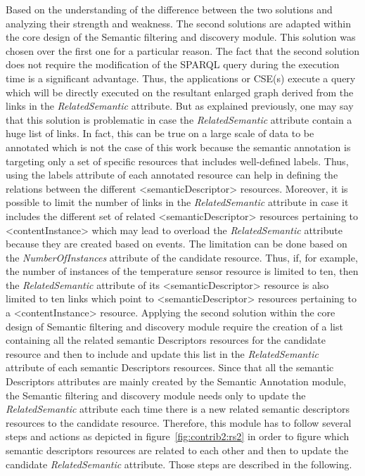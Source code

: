 Based on the understanding of the difference between the two solutions and analyzing their strength and weakness. The second solutions are adapted within the core design of the Semantic filtering and discovery module. This solution was chosen over the first one for a particular reason. The fact that the second solution does not require the modification of the SPARQL query during the execution time is a significant advantage. Thus, the applications or CSE(s) execute a query which will be directly executed on the resultant enlarged graph derived from the links in the \textit{RelatedSemantic} attribute. But as explained previously, one may say that this solution is problematic in case the \textit{RelatedSemantic} attribute contain a huge list of links. In fact, this can be true on a large scale of data to be annotated which is not the case of this work because the semantic annotation is targeting only a set of specific resources that includes well-defined labels. Thus, using the labels attribute of each annotated resource can help in defining the relations between the different <semanticDescriptor> resources. Moreover, it is possible to limit the number of links in the \textit{RelatedSemantic} attribute in case it includes the different set of related <semanticDescriptor> resources pertaining to <contentInstance> which may lead to overload the \textit{RelatedSemantic} attribute because they are created based on events. The limitation can be done based on the \textit{NumberOfInstances} attribute of the candidate resource. Thus, if, for example, the number of instances of the temperature sensor resource is limited to ten, then the \textit{RelatedSemantic} attribute of its <semanticDescriptor> resource is also limited to ten links which point to <semanticDescriptor> resources pertaining to a <contentInstance> resource.
Applying the second solution within the core design of Semantic filtering and discovery module require the creation of a list containing all the related semantic Descriptors resources for the candidate resource and then to include and update this list in the \textit{RelatedSemantic} attribute of each semantic Descriptors resources. Since that all the semantic Descriptors attributes are mainly created by the Semantic Annotation module, the Semantic filtering and discovery module needs only to update the \textit{RelatedSemantic} attribute each time there is a new related semantic descriptors resources to the candidate resource. Therefore, this module has to follow several steps and actions as depicted in figure~\ref{fig:contrib2:rs2} in order to figure which semantic descriptors resources are related to each other and then to update the candidate \textit{RelatedSemantic} attribute. Those steps are described in the following. 

